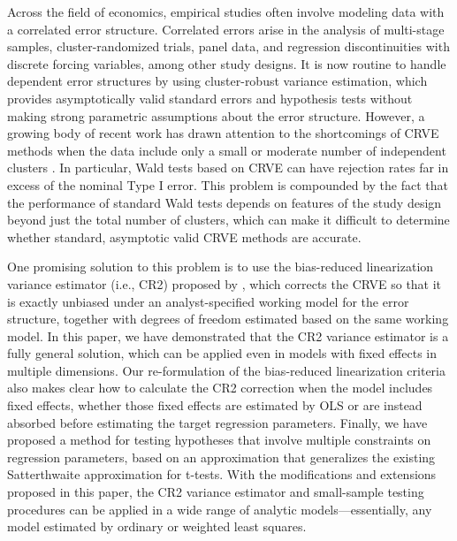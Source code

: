 \documentclass[draft]{ectaart}\usepackage[]{graphicx}\usepackage[]{color}
\begin{document}
Across the field of economics, empirical studies often involve modeling data with a correlated error structure. 
Correlated errors arise in the analysis of multi-stage samples, cluster-randomized trials, panel data, and regression discontinuities with discrete forcing variables, among other study designs. 
It is now routine to handle dependent error structures by using cluster-robust variance estimation, which provides asymptotically valid standard errors and hypothesis tests without making strong parametric assumptions about the error structure. 
However, a growing body of recent work has drawn attention to the shortcomings of CRVE methods when the data include only a small or moderate number of independent clusters \citep{Cameron2008bootstrap, Cameron2015practitioners, Imbens2015robust, Webb2013wild}. 
In particular, Wald tests based on CRVE can have rejection rates far in excess of the nominal Type I error. 
This problem is compounded by the fact that the performance of standard Wald tests depends on features of the study design beyond just the total number of clusters, which can make it difficult to determine whether standard, asymptotic valid CRVE methods are accurate. 


One promising solution to this problem is to use the bias-reduced linearization variance estimator (i.e., CR2) proposed by \citet{Bell2002bias}, which corrects the CRVE so that it is exactly unbiased under an analyst-specified working model for the error structure, together with degrees of freedom estimated based on the same working model.
In this paper, we have demonstrated that the CR2 variance estimator is a fully general solution, which can be applied even in models with fixed effects in multiple dimensions. 
Our re-formulation of the bias-reduced linearization criteria also makes clear how to calculate the CR2 correction when the model includes fixed effects, whether those fixed effects are estimated by OLS or are instead absorbed before estimating the target regression parameters.  
Finally, we have proposed a method for testing hypotheses that involve multiple constraints on regression parameters, based on an approximation that generalizes the existing Satterthwaite approximation for t-tests.  
With the modifications and extensions proposed in this paper, the CR2 variance estimator and small-sample testing procedures can be applied in a wide range of analytic models---essentially, any model estimated by ordinary or weighted least squares. 
\end{document}
